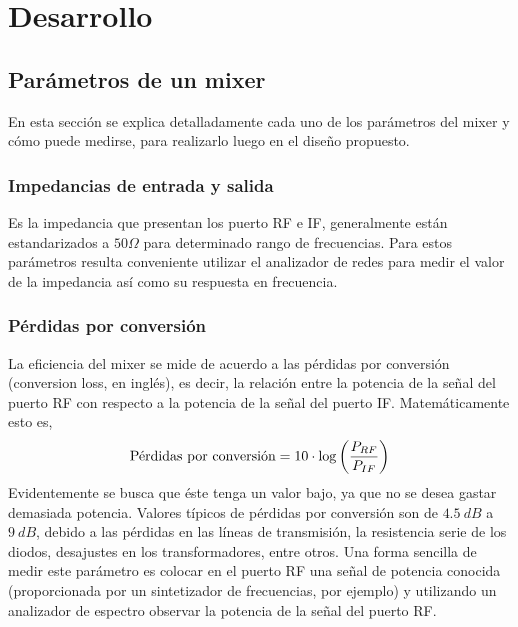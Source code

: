 \documentclass[a4paper,10pt]{article}
\begin{document}
\newpage
\section{Desarrollo}
	\subsection{Parámetros de un mixer}
	En esta secci\'on se explica detalladamente cada uno de los par\'ametros del mixer y c\'omo puede medirse, para realizarlo luego en el dise\~no propuesto.
		\subsubsection{Impedancias de entrada y salida}
		Es la impedancia que presentan los puerto RF e IF, generalmente est\'an estandarizados a $50\Omega$ para determinado rango de frecuencias. Para estos par\'ametros resulta conveniente utilizar el analizador de redes para medir el valor de la impedancia as\'i como su respuesta en frecuencia.
		\subsubsection{P\'erdidas por conversi\'on}
		\indent La eficiencia del mixer se mide de acuerdo a las p\'erdidas por conversi\'on (conversion loss, en ingl\'es), es decir, la 
		relación entre la potencia de la señal del puerto RF con respecto a la potencia de la señal del puerto IF. Matem\'aticamente esto es,
		$$\textmd{P\'erdidas por conversi\'on}=10\cdot\log\left(\frac{P_{RF}}{P_{IF}}\right)$$
		Evidentemente se busca que \'este tenga un valor bajo, ya que no se desea gastar demasiada potencia. Valores t\'ipicos de p\'erdidas por conversi\'on son de $4.5~dB$ a $9~dB$, debido a las p\'erdidas en las l\'ineas de transmisi\'on, la resistencia serie de los diodos, desajustes en los transformadores, entre otros.
		Una forma sencilla de medir este par\'ametro es colocar en el puerto RF una señal de potencia conocida (proporcionada por un sintetizador de frecuencias, por ejemplo) y utilizando un analizador de espectro observar la potencia de la señal del puerto RF.
		
\end{document}

